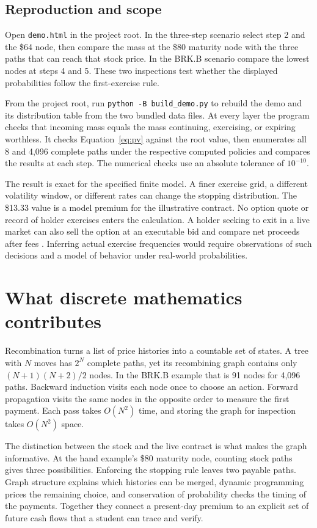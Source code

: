 \documentclass[11pt]{article}
\begin{document}
\subsection{Reproduction and scope}
Open \texttt{demo.html} in the project root. In the three-step scenario select step 2 and the \$64 node, then compare the mass at the \$80 maturity node with the three paths that can reach that stock price. In the BRK.B scenario compare the lowest nodes at steps 4 and 5. These two inspections test whether the displayed probabilities follow the first-exercise rule.

From the project root, run \texttt{python -B build\_demo.py} to rebuild the demo and its distribution table from the two bundled data files. At every layer the program checks that incoming mass equals the mass continuing, exercising, or expiring worthless. It checks Equation~\eqref{eq:pv} against the root value, then enumerates all 8 and 4,096 complete paths under the respective computed policies and compares the results at each step. The numerical checks use an absolute tolerance of $10^{-10}$.

The result is exact for the specified finite model. A finer exercise grid, a different volatility window, or different rates can change the stopping distribution. The \$13.33 value is a model premium for the illustrative contract. No option quote or record of holder exercises enters the calculation. A holder seeking to exit in a live market can also sell the option at an executable bid and compare net proceeds after fees \citep{oic}. Inferring actual exercise frequencies would require observations of such decisions and a model of behavior under real-world probabilities.

\section{What discrete mathematics contributes}
Recombination turns a list of price histories into a countable set of states. A tree with $N$ moves has $2^N$ complete paths, yet its recombining graph contains only $(N+1)(N+2)/2$ nodes. In the BRK.B example that is 91 nodes for 4,096 paths. Backward induction visits each node once to choose an action. Forward propagation visits the same nodes in the opposite order to measure the first payment. Each pass takes $O(N^2)$ time, and storing the graph for inspection takes $O(N^2)$ space.

The distinction between the stock and the live contract is what makes the graph informative. At the hand example's \$80 maturity node, counting stock paths gives three possibilities. Enforcing the stopping rule leaves two payable paths. Graph structure explains which histories can be merged, dynamic programming prices the remaining choice, and conservation of probability checks the timing of the payments. Together they connect a present-day premium to an explicit set of future cash flows that a student can trace and verify.

\balance

\end{document}
